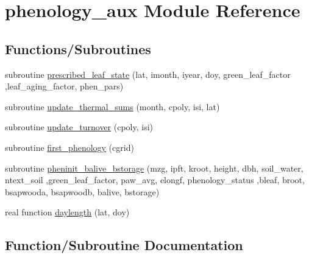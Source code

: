 \hypertarget{namespacephenology__aux}{}\section{phenology\+\_\+aux Module Reference}
\label{namespacephenology__aux}
\subsection*{Functions/\+Subroutines}
\begin{DoxyCompactItemize}
\item 
subroutine \hyperlink{namespacephenology__aux_ac2a698e44f1d2308f845a66ad92600e1}{prescribed\+\_\+leaf\+\_\+state} (lat, imonth, iyear, doy, green\+\_\+leaf\+\_\+factor                                                                                                                                                                                                       ,leaf\+\_\+aging\+\_\+factor, phen\+\_\+pars)
\item 
subroutine \hyperlink{namespacephenology__aux_a227cf46507f7976ea4dd53e724e157c0}{update\+\_\+thermal\+\_\+sums} (month, cpoly, isi, lat)
\item 
subroutine \hyperlink{namespacephenology__aux_a7a199ed988a720b2e56c3b5e1407995a}{update\+\_\+turnover} (cpoly, isi)
\item 
subroutine \hyperlink{namespacephenology__aux_ac9c11ddf83cd16439262bc9c7c72bf2e}{first\+\_\+phenology} (cgrid)
\item 
subroutine \hyperlink{namespacephenology__aux_a678dc0aeea995ed48f816c0588d15965}{pheninit\+\_\+balive\+\_\+bstorage} (mzg, ipft, kroot, height, dbh, soil\+\_\+water, ntext\+\_\+soil                                                                                                                                                                   ,green\+\_\+leaf\+\_\+factor, paw\+\_\+avg, elongf, phenology\+\_\+status                                                                                                                                                           ,bleaf, broot, bsapwooda, bsapwoodb, balive, bstorage)
\item 
real function \hyperlink{namespacephenology__aux_a6fd36340ae7c75f11750adbf09d700d9}{daylength} (lat, doy)
\end{DoxyCompactItemize}


\subsection{Function/\+Subroutine Documentation}
\hypertarget{namespacephenology__aux_a6fd36340ae7c75f11750adbf09d700d9}{}
